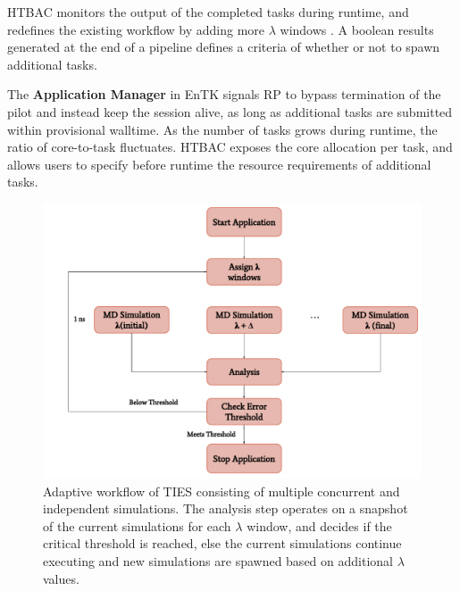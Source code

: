 HTBAC monitors the output of the completed tasks during runtime, and
redefines the existing workflow by adding more $\lambda$ windows . A boolean results generated
at the end of a pipeline defines a criteria of whether or not
 to spawn additional
tasks.


The \textbf{Application Manager} in EnTK signals RP to bypass termination of
the pilot and instead keep the session alive, as long as additional tasks are
submitted within provisional walltime. As the number of tasks grows during runtime, the ratio of
core-to-task fluctuates. HTBAC exposes the core allocation per task, and
allows users to specify before runtime the resource requirements of
additional tasks.

\begin{figure}
  \centering
  \includegraphics[width=\columnwidth]{figures/adaptive_TIES_workflow_diagram.pdf}
  \caption{Adaptive workflow of TIES consisting of multiple concurrent and
  independent simulations. The analysis step operates on a snapshot of the
  current simulations for each $\lambda$ window, and decides if the critical
  threshold is reached, else the current simulations continue executing and
  new simulations are spawned based on additional $\lambda$ values.}
\label{fig:adaptive_ties}
\end{figure}

